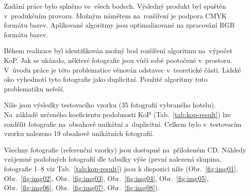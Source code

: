 %


Zadání práce bylo splněno ve~všech bodech. Výsledný produkt byl spuštěn v~produkčním provozu. Možným námětem na~rozšíření je podpora CMYK~\cite{cmyk} formátu barev. Aplikované algoritmy jsou optimalizované na zpracování RGB formátu barev.

Během realizace byl identifikován možný bod rozšíření algoritmu na~výpočet KoP. Jak se ukázalo, některé fotografie jsou vůči sobě pootočené v~prostoru. V~úvodu práce je této problematice věnován odstavec v~teoretické části. Lidské oko vyhodnotí tyto fotografie jako duplicitní. Použité algoritmy tuto problematiku neřeší.

Níže jsou výsledky testovacího vzorku (35 fotografií vybraného hotelu). Na~základě určeného koeficientu podobnosti KoP (Tab.~\ref{tab:kop-result}) lze rozdělit fotografie na~obsahově unikátní a~duplicitní. Celkem bylo v~testovacím vzorku nalezeno 19 obsahově unikátních fotografií.


Všechny fotografie (referenční vzorky) jsou dostupné na~přiloženém CD. Náhledy vzájemně podobných fotografií dle tabulky výše (první nalezená skupina, fotografie 1--8 viz Tab.~\ref{tab:kop-result}) jsou k dispozici níže (Obr.~\ref{fig:img01}, Obr.~\ref{fig:img02}, Obr.~\ref{fig:img03}, Obr.~\ref{fig:img04}, Obr.~\ref{fig:img05}, Obr.~\ref{fig:img06}, Obr.~\ref{fig:img07}, Obr.~\ref{fig:img08}).

